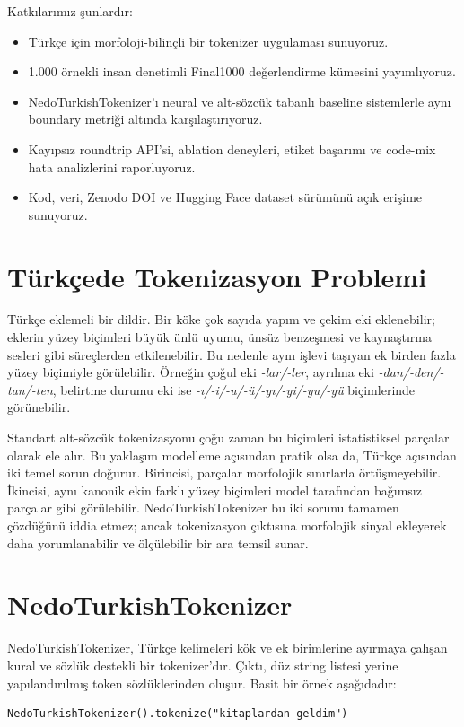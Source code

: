 \documentclass[11pt]{article}
\begin{document}
Katkılarımız şunlardır:
\begin{itemize}[leftmargin=*]
    \item Türkçe için morfoloji-bilinçli bir tokenizer uygulaması sunuyoruz.
    \item 1.000 örnekli insan denetimli Final1000 değerlendirme kümesini yayımlıyoruz.
    \item NedoTurkishTokenizer'ı neural ve alt-sözcük tabanlı baseline sistemlerle aynı boundary metriği altında karşılaştırıyoruz.
    \item Kayıpsız roundtrip API'si, ablation deneyleri, etiket başarımı ve code-mix hata analizlerini raporluyoruz.
    \item Kod, veri, Zenodo DOI ve Hugging Face dataset sürümünü açık erişime sunuyoruz.
\end{itemize}

\section{Türkçede Tokenizasyon Problemi}
Türkçe eklemeli bir dildir. Bir köke çok sayıda yapım ve çekim eki eklenebilir; eklerin yüzey biçimleri büyük ünlü uyumu, ünsüz benzeşmesi ve kaynaştırma sesleri gibi süreçlerden etkilenebilir. Bu nedenle aynı işlevi taşıyan ek birden fazla yüzey biçimiyle görülebilir. Örneğin çoğul eki \emph{-lar/-ler}, ayrılma eki \emph{-dan/-den/-tan/-ten}, belirtme durumu eki ise \emph{-ı/-i/-u/-ü/-yı/-yi/-yu/-yü} biçimlerinde görünebilir.

Standart alt-sözcük tokenizasyonu çoğu zaman bu biçimleri istatistiksel parçalar olarak ele alır. Bu yaklaşım modelleme açısından pratik olsa da, Türkçe açısından iki temel sorun doğurur. Birincisi, parçalar morfolojik sınırlarla örtüşmeyebilir. İkincisi, aynı kanonik ekin farklı yüzey biçimleri model tarafından bağımsız parçalar gibi görülebilir. NedoTurkishTokenizer bu iki sorunu tamamen çözdüğünü iddia etmez; ancak tokenizasyon çıktısına morfolojik sinyal ekleyerek daha yorumlanabilir ve ölçülebilir bir ara temsil sunar.

\section{NedoTurkishTokenizer}
NedoTurkishTokenizer, Türkçe kelimeleri kök ve ek birimlerine ayırmaya çalışan kural ve sözlük destekli bir tokenizer'dır. Çıktı, düz string listesi yerine yapılandırılmış token sözlüklerinden oluşur. Basit bir örnek aşağıdadır:

\begin{verbatim}
NedoTurkishTokenizer().tokenize("kitaplardan geldim")
\end{verbatim}
\end{document}
